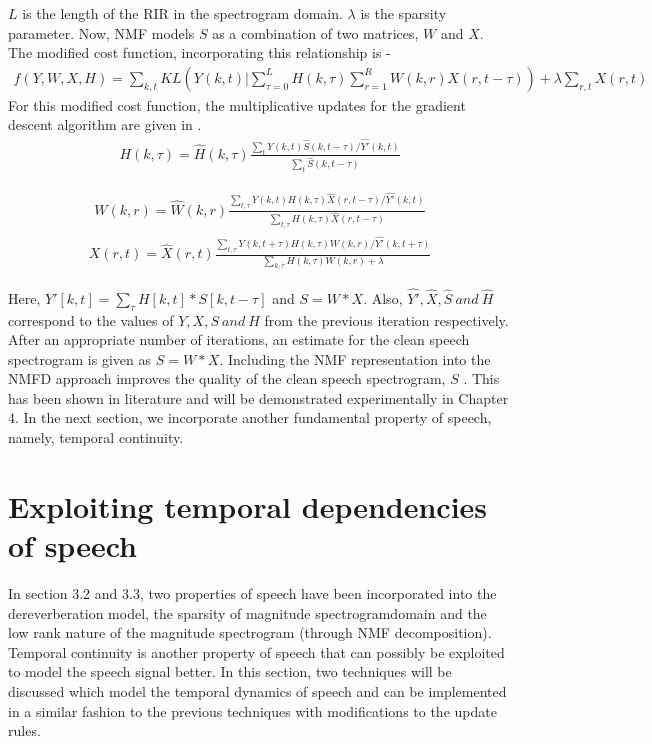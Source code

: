 $L$ is the length of the RIR in the spectrogram domain. $\lambda$ is the sparsity parameter. Now, NMF models $S$ as a combination of two matrices, $W$ and $X$. The modified cost function, incorporating this relationship is -
\begin{align}
f(Y,W,X,H) = \sum_{k,t} KL(Y(k,t)|\sum_{\tau = 0}^{L}H(k, \tau)\sum_{r =1}^{R}W(k,r)X(r,t-\tau)) + \lambda \sum_{r,t}X(r,t)
\end{align}
For this modified cost function, the multiplicative updates for the gradient descent algorithm are given in \cite{moham}.
\begin{align}H(k,\tau) = \hat{H}(k,\tau) \frac{\sum_{t}Y(k,t)\hat{S}(k,t - \tau)/\hat{Y'}(k,t)}{\sum_{t}\hat{S}(k,t - \tau)}
\end{align}

\begin{align}W(k,r) = \hat{W}(k,r) \frac{\sum_{t,\tau}Y(k,t)H(k,\tau)\hat{X}(r,t - \tau)/\hat{Y'}(k,t)}{\sum_{t,\tau}H(k,\tau)\hat{X}(r,t - \tau)}
\end{align}
\begin{align}X(r,t) = \hat{X}(r,t)\frac{\sum_{t,\tau}Y(k,t + \tau)H(k,\tau)W(k,r)/\hat{Y'}(k,t + \tau)}{\sum_{k,\tau}H(k,\tau)W(k,r) + \lambda}
\end{align}

Here,
$Y'[k,t] = \sum_{\tau}H[k,t]*S[k,t - \tau]$  and $S = W*X$. Also, $\hat{Y'}, \hat{X},\hat{S} \ and \  \hat{H}$ correspond to the values of $Y,X,S \ and \ H$ from the previous iteration respectively. 
After an appropriate number of iterations, an estimate for the clean speech spectrogram is given as $S = W*X$. 
Including the NMF representation into the NMFD approach improves the quality of the clean speech spectrogram, $S$ \cite{moham}. This has been shown in literature and will be demonstrated experimentally in Chapter 4. In the next section, we incorporate another fundamental property of speech, namely, temporal continuity. 
\section{Exploiting temporal dependencies of speech }
In section 3.2 and 3.3, two properties of speech have been incorporated into the dereverberation model, the sparsity of magnitude spectrogramdomain and the low rank nature of the magnitude spectrogram (through NMF decomposition). Temporal continuity is another property of speech that can possibly be exploited to model the speech signal better. In this section, two techniques will be discussed which model the temporal dynamics of speech and can be implemented in a similar fashion to the previous techniques with modifications to the update rules.
